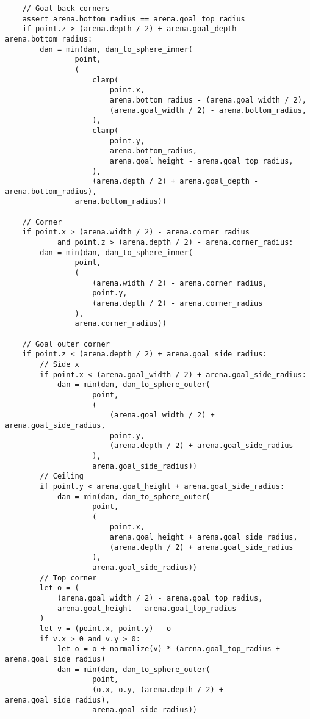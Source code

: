 \begin{verbatim}
    // Goal back corners
    assert arena.bottom_radius == arena.goal_top_radius
    if point.z > (arena.depth / 2) + arena.goal_depth - arena.bottom_radius:
        dan = min(dan, dan_to_sphere_inner(
                point,
                (
                    clamp(
                        point.x,
                        arena.bottom_radius - (arena.goal_width / 2),
                        (arena.goal_width / 2) - arena.bottom_radius,
                    ),
                    clamp(
                        point.y,
                        arena.bottom_radius,
                        arena.goal_height - arena.goal_top_radius,
                    ),
                    (arena.depth / 2) + arena.goal_depth - arena.bottom_radius),
                arena.bottom_radius))

    // Corner
    if point.x > (arena.width / 2) - arena.corner_radius
            and point.z > (arena.depth / 2) - arena.corner_radius:
        dan = min(dan, dan_to_sphere_inner(
                point,
                (
                    (arena.width / 2) - arena.corner_radius,
                    point.y,
                    (arena.depth / 2) - arena.corner_radius
                ),
                arena.corner_radius))

    // Goal outer corner
    if point.z < (arena.depth / 2) + arena.goal_side_radius:
        // Side x
        if point.x < (arena.goal_width / 2) + arena.goal_side_radius:
            dan = min(dan, dan_to_sphere_outer(
                    point,
                    (
                        (arena.goal_width / 2) + arena.goal_side_radius,
                        point.y,
                        (arena.depth / 2) + arena.goal_side_radius
                    ),
                    arena.goal_side_radius))
        // Ceiling
        if point.y < arena.goal_height + arena.goal_side_radius:
            dan = min(dan, dan_to_sphere_outer(
                    point,
                    (
                        point.x,
                        arena.goal_height + arena.goal_side_radius,
                        (arena.depth / 2) + arena.goal_side_radius
                    ),
                    arena.goal_side_radius))
        // Top corner
        let o = (
            (arena.goal_width / 2) - arena.goal_top_radius,
            arena.goal_height - arena.goal_top_radius
        )
        let v = (point.x, point.y) - o
        if v.x > 0 and v.y > 0:
            let o = o + normalize(v) * (arena.goal_top_radius + arena.goal_side_radius)
            dan = min(dan, dan_to_sphere_outer(
                    point,
                    (o.x, o.y, (arena.depth / 2) + arena.goal_side_radius),
                    arena.goal_side_radius))


\end{verbatim}
